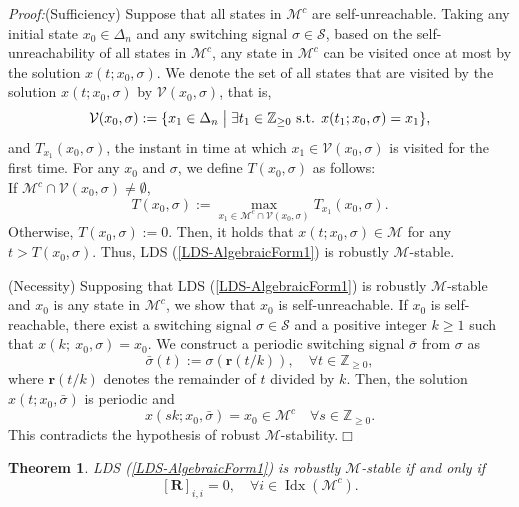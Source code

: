 \documentclass[11pt,onecolumn]{article}
\DeclareMathOperator{\idx}{Idx}
\newtheorem{theorem}{Theorem}
\begin{document}
{\it Proof:}\quad (Sufficiency) Suppose that all states in $\mathcal M^c$ are self-unreachable. Taking any initial state $ x_0\in\Delta_n$ and any switching signal $\sigma\in\mathcal S$, based on the self-unreachability of all states in $\mathcal M^c$, any state in $\mathcal M^c$ can be visited once at most by the solution $ x(t; x_0,\sigma)$. We denote the set of all states that are visited by the solution $ x(t; x_0,\sigma)$ by $\mathcal V( x_0,\sigma)$, that is,
  \[\mathcal V(  x_0,\sigma):=\{ x_1\in\Delta_n\bigm| \exists t_1\in\mathbb Z_{\geq 0} \mbox{ s.t. }   x(t_1; x_0,\sigma)= x_1\},\]
and $T_{ x_1}( x_0,\sigma)$, the instant in time at which $ x_1\in \mathcal V( x_0,\sigma)$ is visited for the first time. For any $ x_0$ and $\sigma$, we define  $T( x_0,\sigma)$ as follows: \\
If $\mathcal M^c\cap\mathcal V( x_0,\sigma)\neq\emptyset$,
\[T( x_0,\sigma):=\max_{ x_1\in\mathcal M^c\cap\mathcal V( x_0,\sigma)}T_{ x_1}( x_0,\sigma).\]
Otherwise, $T( x_0,\sigma):=0$.
Then, it holds that $ x(t; x_0,\sigma)\in\mathcal M$ for any $t>T( x_0,\sigma)$. Thus, LDS (\ref{LDS-AlgebraicForm1}) is robustly $\mathcal M$-stable.

(Necessity) Supposing that LDS (\ref{LDS-AlgebraicForm1}) is robustly $\mathcal M$-stable and $ x_0$ is any state in $\mathcal M^c$, we show that $ x_0$ is self-unreachable. If $ x_0$ is self-reachable, there exist a switching signal $\sigma\in\mathcal S$ and a positive integer $k\geq1$ such that
$ x(k;\ x_0,\sigma)= x_0$.
We construct a periodic switching signal $\bar\sigma$ from $\sigma$ as
\[\bar\sigma(t):=\sigma(\mathbf r(t/k)),\quad\forall t\in\mathbb Z_{\geq0},\]
where $\mathbf r(t/k)$ denotes the remainder of $t$ divided by $k$.
Then, the solution $ x(t; x_0,\bar\sigma)$ is periodic and
\[ x(sk; x_0,\bar\sigma)= x_0\in\mathcal M^c\quad\forall s\in\mathbb Z_{\geq0}.\]
This contradicts the hypothesis of robust $\mathcal M$-stability.\hfill$\Box$

\begin{theorem}\label{Theorem1}
   LDS (\ref{LDS-AlgebraicForm1}) is robustly $\mathcal M$-stable if and only if
   \[[\mathbf R]_{i,i}=0,\quad\forall i\in\idx(\mathcal M^c).\]

\end{theorem}
\end{document}
